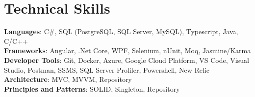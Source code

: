 \documentclass[letterpaper,11pt]{article}
\begin{document}
\section{Technical Skills}
 \begin{itemize}[leftmargin=0.15in, label={}]
    \small{\item{
     \textbf{Languages}{: C\#, SQL (PostgreSQL, SQL Server, MySQL), Typescript, Java, C/C++} \\
     \textbf{Frameworks}{: Angular, .Net Core, WPF, Selenium, nUnit, Moq, Jasmine/Karma} \\
     \textbf{Developer Tools}{: Git, Docker, Azure, Google Cloud Platform, VS Code, Visual Studio, Postman, SSMS, SQL Server Profiler, Powershell, New Relic} \\
     \textbf{Architecture}{: MVC, MVVM, Repository} \\
     \textbf{Principles and Patterns}{: SOLID, Singleton, Repository} \\
    }}
 \end{itemize}


\end{document}

